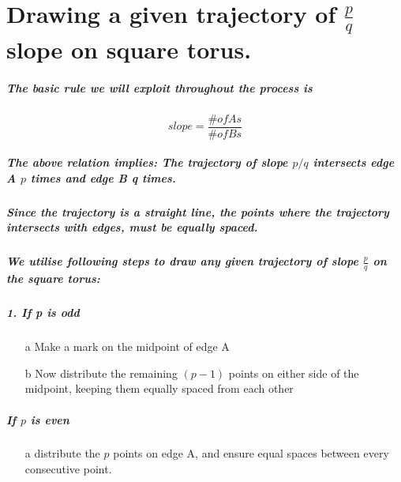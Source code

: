 \documentclass{report}
\begin{document}
\chapter{Drawing a given trajectory of $\frac{p}{q}$ slope on square torus.}


\paragraph{The basic rule we will exploit throughout the process is}

\begin{displaymath}
slope=\frac{\# of As}{\# of Bs}
\end{displaymath}

\paragraph{The above relation implies: The trajectory of slope $p/q$ intersects edge A $p$ times and edge B q times.}

\paragraph{Since the trajectory is a straight line, the points where the trajectory intersects with edges, must be equally spaced.}

\paragraph{We utilise following steps to draw any given trajectory of slope $\frac{p}{q}$ on the square torus:}

\paragraph{1. If p is odd}

\begin{enumerate}
\item[a]  {Make a mark on the midpoint of edge A}

\item[b]  {Now distribute the remaining $(p-1)$ points on either side of the midpoint, keeping them equally spaced from each other}
\end{enumerate}

\paragraph{\quad If $p$ is even}
\begin{enumerate}
\item[a]  {distribute the $p$ points on edge A, and ensure equal spaces between every consecutive point.}
\end{enumerate}
\end{document}
